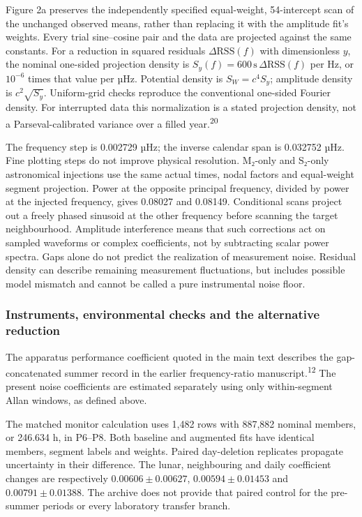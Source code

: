\documentclass[
  10pt,
  a4paper,
]{article}
\begin{document}
Figure 2a preserves the independently specified equal-weight,
54-intercept scan of the unchanged observed means, rather than replacing
it with the amplitude fit's weights. Every trial sine--cosine pair and
the data are projected against the same constants. For a reduction in
squared residuals \(\Delta\mathrm{RSS}(f)\) with dimensionless \(y\),
the nominal one-sided projection density is
\(S_y(f)=600\,\mathrm{s}\,\Delta\mathrm{RSS}(f)\) per Hz, or \(10^{-6}\)
times that value per µHz. Potential density is \(S_W=c^4S_y\); amplitude
density is \(c^2\sqrt{S_y}\). Uniform-grid checks reproduce the
conventional one-sided Fourier density. For interrupted data this
normalization is a stated projection density, not a Parseval-calibrated
variance over a filled year.\textsuperscript{20}

The frequency step is 0.002729 µHz; the inverse calendar span is
0.032752 µHz. Fine plotting steps do not improve physical resolution.
M₂-only and S₂-only astronomical injections use the same actual times,
nodal factors and equal-weight segment projection. Power at the opposite
principal frequency, divided by power at the injected frequency, gives
0.08027 and 0.08149. Conditional scans project out a freely phased
sinusoid at the other frequency before scanning the target
neighbourhood. Amplitude interference means that such corrections act on
sampled waveforms or complex coefficients, not by subtracting scalar
power spectra. Gaps alone do not predict the realization of measurement
noise. Residual density can describe remaining measurement fluctuations,
but includes possible model mismatch and cannot be called a pure
instrumental noise floor.

\hypertarget{instruments-environmental-checks-and-the-alternative-reduction}{%
\subsubsection{Instruments, environmental checks and the alternative
reduction}\label{instruments-environmental-checks-and-the-alternative-reduction}}

The apparatus performance coefficient quoted in the main text describes
the gap-concatenated summer record in the earlier frequency-ratio
manuscript.\textsuperscript{12} The present noise coefficients are
estimated separately using only within-segment Allan windows, as defined
above.

The matched monitor calculation uses 1,482 rows with 887,882 nominal
members, or 246.634 h, in P6--P8. Both baseline and augmented fits have
identical members, segment labels and weights. Paired day-deletion
replicates propagate uncertainty in their difference. The lunar,
neighbouring and daily coefficient changes are respectively
\(0.00606\pm0.00627\), \(0.00594\pm0.01453\) and \(0.00791\pm0.01388\).
The archive does not provide that paired control for the pre-summer
periods or every laboratory transfer branch.
\end{document}
